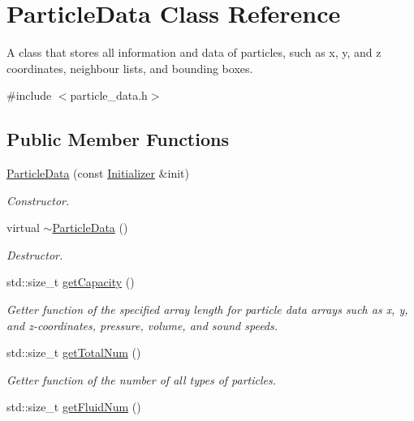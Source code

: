 \hypertarget{classParticleData}{\section{Particle\-Data Class Reference}
\label{classParticleData}
}


A class that stores all information and data of particles, such as x, y, and z coordinates, neighbour lists, and bounding boxes.  




{\ttfamily \#include $<$particle\-\_\-data.\-h$>$}

\subsection*{Public Member Functions}
\begin{DoxyCompactItemize}
\item 
\hyperlink{classParticleData_a462cb717b56e25a02ed1da805d1a7e53}{Particle\-Data} (const \hyperlink{classInitializer}{Initializer} \&init)
\begin{DoxyCompactList}\small\item\em Constructor. \end{DoxyCompactList}\item 
virtual \hyperlink{classParticleData_a09673bdd8f17c8a39f1292df5727d71d}{$\sim$\-Particle\-Data} ()
\begin{DoxyCompactList}\small\item\em Destructor. \end{DoxyCompactList}\item 
std\-::size\-\_\-t \hyperlink{classParticleData_a2b27f85dccbf0fa6dcfa69aac3afba7c}{get\-Capacity} ()
\begin{DoxyCompactList}\small\item\em Getter function of the specified array length for particle data arrays such as x, y, and z-\/coordinates, pressure, volume, and sound speeds. \end{DoxyCompactList}\item 
std\-::size\-\_\-t \hyperlink{classParticleData_a8540779a3428501d6f45a31e58ad36bd}{get\-Total\-Num} ()
\begin{DoxyCompactList}\small\item\em Getter function of the number of {\itshape all} types of particles. \end{DoxyCompactList}\item 
std\-::size\-\_\-t \hyperlink{classParticleData_aa3b6b967658f755ff919a53c7d6f08fe}{get\-Fluid\-Num} ()

\end{DoxyCompactItemize}
